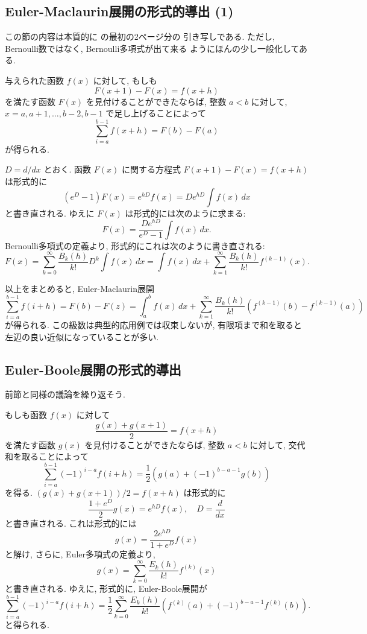 \documentclass[12pt,twoside]{jarticle}
\theoremstyle{jplain}
\theoremstyle{jplain}
\theoremstyle{jplain}
\numberwithin{theorem}{section}
\numberwithin{equation}{section}
\numberwithin{figure}{section}
\numberwithin{table}{section}
\begin{document}

\subsection{Euler-Maclaurin展開の形式的導出 (1)}
\label{sec:EM(1)}

この節の内容は本質的に \cite[Chapter 25]{KC} の最初の2ページ分の
引き写しである. ただし, Bernoulli数ではなく, Bernoulli多項式が出て来る
ようにほんの少し一般化してある.

与えられた函数 $f(x)$ に対して, もしも
\[
  F(x+1)-F(x)=f(x+h)
\]
を満たす函数 $F(x)$ を見付けることができたならば,
整数 $a<b$ に対して, $x=a,a+1,\ldots,b-2,b-1$ で足し上げることによって
\[
  \sum_{i=a}^{b-1} f(x+h) = F(b) - F(a)
\]
が得られる.

$D=d/dx$ とおく. 函数 $F(x)$ に関する方程式 $F(x+1)-F(x)=f(x+h)$ は形式的に
\[
  (e^D-1)F(x)
  = e^{hD}f(x)
  = De^{hD}\int f(x)\,dx
\]
と書き直される. ゆえに $F(x)$ は形式的には次のように求まる:
\[
  F(x) = \frac{De^{hD}}{e^D-1}\int f(x)\,dx.
\]
Bernoulli多項式の定義より, 形式的にこれは次のように書き直される:
\[
  F(x)
  = \sum_{k=0}^\infty\frac{B_k(h)}{k!}D^k\int f(x)\,dx
  = \int f(x)\,dx + \sum_{k=1}^\infty \frac{B_k(h)}{k!}f^{(k-1)}(x).
\]

以上をまとめると, Euler-Maclaurin展開
\[
  \sum_{i=a}^{b-1}f(i+h)
  = F(b)-F(z)
  = \int_a^b f(x)\,dx
  + \sum_{k=1}^\infty \frac{B_k(h)}{k!}(f^{(k-1)}(b)-f^{(k-1)}(a))
\]
が得られる. この級数は典型的応用例では収束しないが,
有限項まで和を取ると左辺の良い近似になっていることが多い.


\subsection{Euler-Boole展開の形式的導出}

前節と同様の議論を繰り返そう.

もしも函数 $f(x)$ に対して
\[
  \frac{g(x) + g(x+1)}{2} = f(x+h)
\]
を満たす函数 $g(x)$ を見付けることができたならば,
整数 $a<b$ に対して, 交代和を取ることによって
\[
  \sum_{i=a}^{b-1}(-1)^{i-a} f(i+h)
  = \frac12(g(a) + (-1)^{b-a-1}g(b))
\]
を得る.  $(g(x)+g(x+1))/2=f(x+h)$ は形式的に
\[
  \frac{1+e^D}{2}g(x) = e^{hD}f(x), \quad D = \frac{d}{dx}
\]
と書き直される. これは形式的には
\[
  g(x) = \frac{2e^{hD}}{1+e^D}f(x)
\]
と解け, さらに, Euler多項式の定義より,
\[
  g(x) = \sum_{k=0}^\infty \frac{E_k(h)}{k!}f^{(k)}(x)
\]
と書き直される. ゆえに, 形式的に, Euler-Boole展開が
\[
  \sum_{i=a}^{b-1}(-1)^{i-a} f(i+h)
  =\frac12\sum_{k=0}^\infty\frac{E_k(h)}{k!}(f^{(k)}(a)+(-1)^{b-a-1}f^{(k)}(b)).
\]
と得られる.
\end{document}
